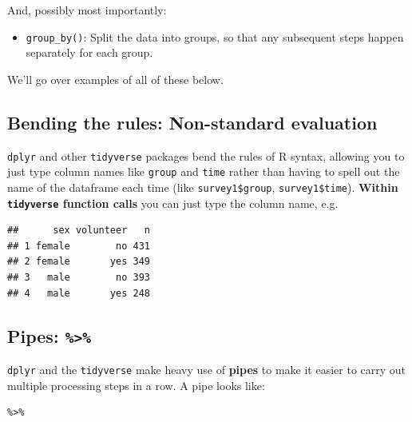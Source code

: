 \documentclass[
]{book}
\newenvironment{Shaded}{\begin{snugshade}}{\end{snugshade}}
\newcommand{\CommentTok}[1]{\textcolor[rgb]{0.56,0.35,0.01}{\textit{#1}}}
\newcommand{\FunctionTok}[1]{\textcolor[rgb]{0.00,0.00,0.00}{#1}}
\newcommand{\NormalTok}[1]{#1}
\newcommand{\SpecialCharTok}[1]{\textcolor[rgb]{0.00,0.00,0.00}{#1}}
\providecommand{\tightlist}{%
  \setlength{\itemsep}{0pt}\setlength{\parskip}{0pt}}
\begin{document}
And, possibly most importantly:

\begin{itemize}
\tightlist
\item
  \texttt{group\_by()}: Split the data into groups, so that any
  subsequent steps happen separately for each group.
\end{itemize}

We'll go over examples of all of these below.

\hypertarget{bending-the-rules-non-standard-evaluation}{%
\subsection{Bending the rules: Non-standard evaluation}\label{bending-the-rules-non-standard-evaluation}}

\texttt{dplyr} and other \texttt{tidyverse} packages bend the rules of R syntax,
allowing you to just type column names like \texttt{group} and \texttt{time} rather than
having to spell out the name of the dataframe each time (like \texttt{survey1\$group},
\texttt{survey1\$time}). \textbf{Within \texttt{tidyverse} function calls} you can just type the
column name, e.g.~

\begin{Shaded}
\end{Shaded}

\begin{verbatim}
##      sex volunteer   n
## 1 female        no 431
## 2 female       yes 349
## 3   male        no 393
## 4   male       yes 248
\end{verbatim}

\hypertarget{pipes}{%
\subsection{\texorpdfstring{Pipes: \texttt{\%\textgreater{}\%}}{Pipes: \%\textgreater\%}}\label{pipes}}

\texttt{dplyr} and the \texttt{tidyverse} make heavy use of \textbf{pipes} to
make it easier to carry out multiple processing steps in a row.
A pipe looks like:

\begin{verbatim}
%>%
\end{verbatim}
\end{document}

